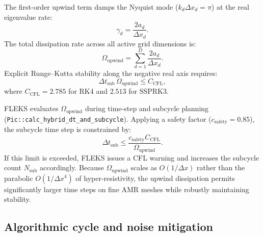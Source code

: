 \documentclass[a4paper, 11pt]{article}
\begin{document}
The first-order upwind term damps the Nyquist mode ($k_d\Delta x_d = \pi$) at the real eigenvalue rate:
\begin{equation}
\gamma_d = \frac{2 a_d}{\Delta x_d}.
\end{equation}
The total dissipation rate across all active grid dimensions is:
\begin{equation}
\Omega_{\text{upwind}} = \sum_{d=1}^D \frac{2 a_d}{\Delta x_d}.
\end{equation}
Explicit Runge--Kutta stability along the negative real axis requires:
\begin{equation}
\Delta t_{\text{sub}}\,\Omega_{\text{upwind}} \le C_{\text{CFL}},
\end{equation}
where $C_{\text{CFL}} = 2.785$ for RK4 and $2.513$ for SSPRK3.

FLEKS evaluates $\Omega_{\text{upwind}}$ during time-step and subcycle planning (\texttt{Pic::calc\_hybrid\_dt\_and\_subcycle}). Applying a safety factor ($c_{\text{safety}} = 0.85$), the subcycle time step is constrained by:
\begin{equation}
\Delta t_{\text{sub}} \le \frac{c_{\text{safety}} C_{\text{CFL}}}{\Omega_{\text{upwind}}}.
\end{equation}
If this limit is exceeded, FLEKS issues a CFL warning and increases the subcycle count $N_{\text{sub}}$ accordingly. Because $\Omega_{\text{upwind}}$ scales as $O(1/\Delta x)$ rather than the parabolic $O(1/\Delta x^4)$ of hyper-resistivity, the upwind dissipation permits significantly larger time steps on fine AMR meshes while robustly maintaining stability.

\subsection{Algorithmic cycle and noise mitigation}
\end{document}
